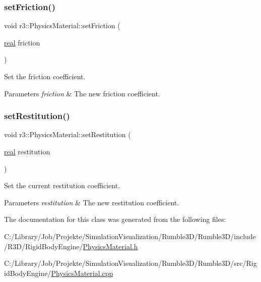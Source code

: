 \subsubsection{\texorpdfstring{set\+Friction()}{setFriction()}}
{\footnotesize\ttfamily void r3\+::\+Physics\+Material\+::set\+Friction (\begin{DoxyParamCaption}\item[{\mbox{\hyperlink{namespacer3_ab2016b3e3f743fb735afce242f0dc1eb}{real}}}]{friction }\end{DoxyParamCaption})}



Set the friction coefficient. 


\begin{DoxyParams}{Parameters}
{\em friction} & The new friction coefficient. \\
\hline
\end{DoxyParams}
\mbox{\label{classr3_1_1_physics_material_a2056c195a2d655aefe9a480c28e67ddb}} 
\subsubsection{\texorpdfstring{set\+Restitution()}{setRestitution()}}
{\footnotesize\ttfamily void r3\+::\+Physics\+Material\+::set\+Restitution (\begin{DoxyParamCaption}\item[{\mbox{\hyperlink{namespacer3_ab2016b3e3f743fb735afce242f0dc1eb}{real}}}]{restitution }\end{DoxyParamCaption})}



Set the current restitution coefficient. 


\begin{DoxyParams}{Parameters}
{\em restitution} & The new restitution coefficient. \\
\hline
\end{DoxyParams}


The documentation for this class was generated from the following files\+:\begin{DoxyCompactItemize}
\item 
C\+:/\+Library/\+Job/\+Projekte/\+Simulation\+Visualization/\+Rumble3\+D/\+Rumble3\+D/include/\+R3\+D/\+Rigid\+Body\+Engine/\mbox{\hyperlink{_physics_material_8h}{Physics\+Material.\+h}}\item 
C\+:/\+Library/\+Job/\+Projekte/\+Simulation\+Visualization/\+Rumble3\+D/\+Rumble3\+D/src/\+Rigid\+Body\+Engine/\mbox{\hyperlink{_physics_material_8cpp}{Physics\+Material.\+cpp}}\end{DoxyCompactItemize}
